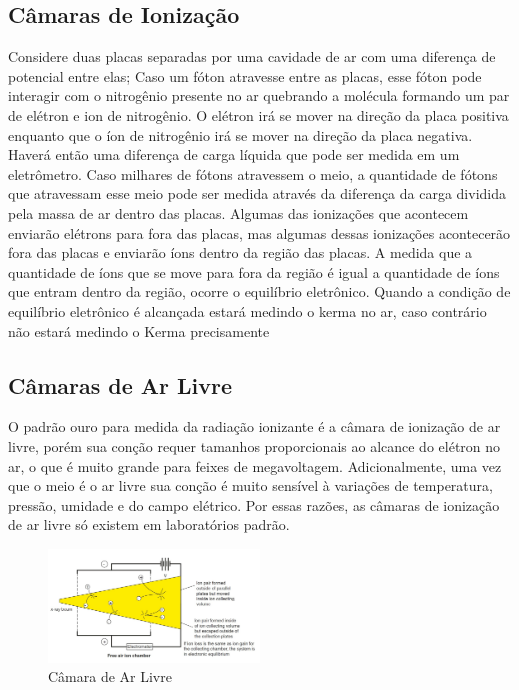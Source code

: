 \documentclass[11pt,a4paper]{article}
\begin{document}
	

	\subsection{Câmaras de Ionização}

		Considere duas placas separadas por uma cavidade de ar com uma diferença de potencial entre elas; Caso um fóton atravesse entre as placas, esse fóton pode interagir com o nitrogênio presente no ar quebrando a molécula formando um par de elétron e ion de nitrogênio. O elétron irá se mover na direção da placa positiva enquanto que o íon de nitrogênio irá se mover na direção da placa negativa. Haverá então uma diferença de carga líquida que pode ser medida em um eletrômetro. Caso milhares de fótons atravessem o meio, a quantidade de fótons que atravessam esse meio pode ser medida através da diferença da carga dividida pela massa de ar dentro das placas. Algumas das ionizações que acontecem enviarão elétrons para fora das placas, mas algumas dessas ionizações acontecerão fora das placas e enviarão íons dentro da região das placas. A medida que a quantidade de íons que se move para fora da região é igual a quantidade de íons que entram dentro da região, ocorre o equilíbrio eletrônico. Quando a condição de equilíbrio eletrônico é alcançada estará medindo o kerma no ar, caso contrário não estará medindo o Kerma precisamente

	

	\subsection{Câmaras de Ar Livre}
		
		O padrão ouro para medida da radiação ionizante é a câmara de ionização de ar livre, porém sua conção requer tamanhos proporcionais ao alcance do elétron no ar, o que é muito grande para feixes de megavoltagem. Adicionalmente, uma vez que o meio é o ar livre sua conção é muito sensível à variações de temperatura, pressão, umidade e do campo elétrico. Por essas razões, as câmaras de ionização de ar livre só existem em laboratórios padrão. 

		\begin{figure}[h]
			\centering
			\includegraphics[width=0.5\textwidth]{Imagens/camaraArLivre.jpg}
			\caption{Câmara de Ar Livre}
			\label{fig:camaraArLivre}
		\end{figure}
\end{document}
